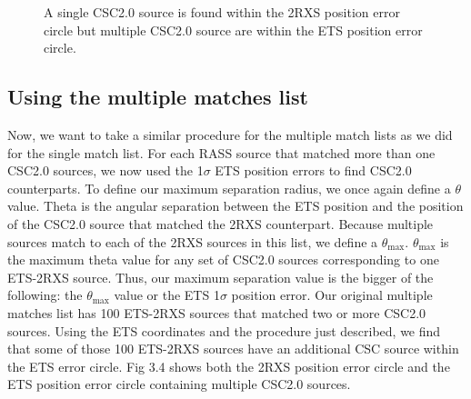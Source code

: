 \FloatBarrier

\begin{figure}[H]
\centering
{}
\caption{A single CSC2.0 source is found within the 2RXS position error circle but multiple CSC2.0 source are within the ETS position error circle. }
\end{figure}


\FloatBarrier

\subsection{Using the multiple matches list}

Now, we want to take a similar procedure for the multiple match lists as we did for the single match list. 
For each RASS source that matched more than one CSC2.0 sources, we now used the 1$\sigma$ ETS position errors to find CSC2.0 counterparts. 
To define our maximum separation radius, we once again define a  $\theta$ value. 
Theta is the angular separation between the ETS position and the  position of the CSC2.0 source that matched the 2RXS counterpart. 
Because multiple sources match to each of the 2RXS sources in this list, we define a $\theta_{ \text{max}  }$. 
 $\theta_{ \text{max}  }$ is the maximum theta value for any set of CSC2.0 sources corresponding to one ETS-2RXS source. 
Thus, our maximum separation value is the bigger of the following: the  $\theta_{ \text{max}  }$ value or the ETS 1$\sigma$ position error. 
Our original multiple matches list has 100 ETS-2RXS sources that matched two or more CSC2.0 sources. 
Using the ETS coordinates and the procedure just described, we find that some of those 100 ETS-2RXS sources have an additional CSC source within the ETS error circle.
Fig 3.4 shows both the 2RXS position error circle and the ETS position error circle containing multiple CSC2.0 sources.

